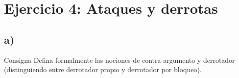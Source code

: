 \documentclass[11pt,a4paper]{article}
\begin{document}
\section{Ejercicio 4: Ataques y derrotas}

\newcommand{\tri}[7]{%
  \draw[thick, draw=#7, fill=#7!25] (#1-#3,#2) -- (#1,#2+#4) -- (#1+#3,#2) -- cycle;
  \node[font=\scriptsize\bfseries] at (#1,#2+0.3*#4) {#5};
  \node[font=\scriptsize\ttfamily, above] at (#1,#2+#4) {#6};}

\subsection{a)}

\begin{enunciado}{Consigna}
Defina formalmente las nociones de contra-argumento y derrotador (distinguiendo entre derrotador propio y derrotador por bloqueo).
\end{enunciado}
\end{document}
